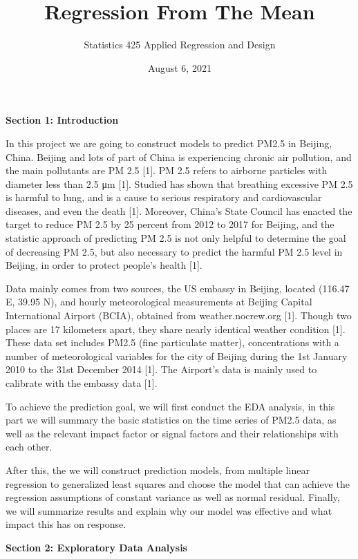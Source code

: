 \documentclass[
]{report}
\title{Regression From The Mean}
\subtitle{by

Zhengtao Xu - Section 1 and Section 2

Jennings Cheng - Sections 2, 3, and 4

Collin Carmichael - Sections 3, and 4}
\author{Statistics 425 Applied Regression and Design}
\date{August 6, 2021}
\begin{document}
\maketitle

\newpage

\textbf{Section 1: Introduction}

In this project we are going to construct models to predict PM2.5 in
Beijing, China. Beijing and lots of part of China is experiencing
chronic air pollution, and the main pollutants are PM 2.5 {[}1{]}. PM
2.5 refers to airborne particles with diameter less than 2.5 μm {[}1{]}.
Studied has shown that breathing excessive PM 2.5 is harmful to lung,
and is a cause to serious respiratory and cardiovascular diseases, and
even the death {[}1{]}. Moreover, China's State Council has enacted the
target to reduce PM 2.5 by 25 percent from 2012 to 2017 for Beijing, and
the statistic approach of predicting PM 2.5 is not only helpful to
determine the goal of decreasing PM 2.5, but also necessary to predict
the harmful PM 2.5 level in Beijing, in order to protect people's health
{[}1{]}.

Data mainly comes from two sources, the US embassy in Beijing, located
(116.47 E, 39.95 N), and hourly meteorological measurements at Beijing
Capital International Airport (BCIA), obtained from weather.nocrew.org
{[}1{]}. Though two places are 17 kilometers apart, they share nearly
identical weather condition {[}1{]}. These data set includes PM2.5 (fine
particulate matter), concentrations with a number of meteorological
variables for the city of Beijing during the 1st January 2010 to the
31st December 2014 {[}1{]}. The Airport's data is mainly used to
calibrate with the embassy data {[}1{]}.

To achieve the prediction goal, we will first conduct the EDA analysis,
in this part we will summary the basic statistics on the time series of
PM2.5 data, as well as the relevant impact factor or signal factors and
their relationships with each other.

After this, the we will construct prediction models, from multiple
linear regression to generalized least squares and choose the model that
can achieve the regression assumptions of constant variance as well as
normal residual. Finally, we will summarize results and explain why our
model was effective and what impact this has on response.

\textbf{Section 2: Exploratory Data Analysis}
\end{document}
